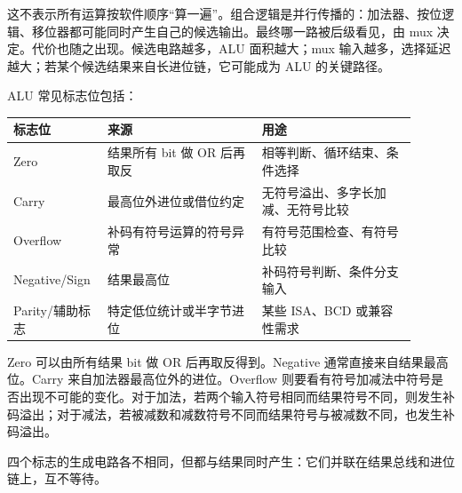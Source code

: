 这不表示所有运算按软件顺序“算一遍”。组合逻辑是并行传播的：加法器、按位逻辑、移位器都可能同时产生自己的候选输出。最终哪一路被后级看见，由 mux 决定。代价也随之出现。候选电路越多，ALU 面积越大；mux 输入越多，选择延迟越大；若某个候选结果来自长进位链，它可能成为 ALU 的关键路径。

ALU 常见标志位包括：

\begin{longtable}{L{0.18\linewidth}L{0.36\linewidth}L{0.36\linewidth}}
\toprule
标志位 & 来源 & 用途 \\
\midrule
Zero & 结果所有 bit 做 OR 后再取反 & 相等判断、循环结束、条件选择 \\\tablerowrule
Carry & 最高位外进位或借位约定 & 无符号溢出、多字长加减、无符号比较 \\\tablerowrule
Overflow & 补码有符号运算的符号异常 & 有符号范围检查、有符号比较 \\\tablerowrule
Negative/Sign & 结果最高位 & 补码符号判断、条件分支输入 \\\tablerowrule
Parity/辅助标志 & 特定低位统计或半字节进位 & 某些 ISA、BCD 或兼容性需求 \\
\bottomrule
\end{longtable}

Zero 可以由所有结果 bit 做 OR 后再取反得到。Negative 通常直接来自结果最高位。Carry 来自加法器最高位外的进位。Overflow 则要看有符号加减法中符号是否出现不可能的变化。对于加法，若两个输入符号相同而结果符号不同，则发生补码溢出；对于减法，若被减数和减数符号不同而结果符号与被减数不同，也发生补码溢出。

四个标志的生成电路各不相同，但都与结果同时产生：它们并联在结果总线和进位链上，互不等待。

